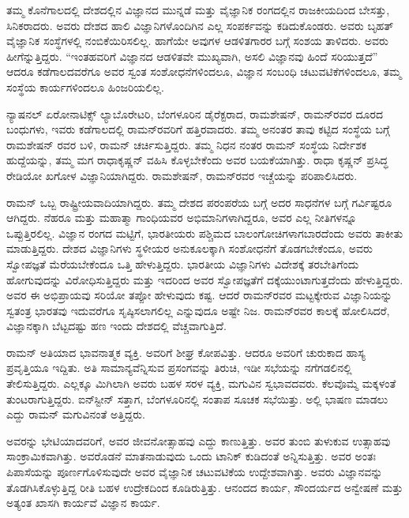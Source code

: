 ತಮ್ಮ ಕೊನೆಗಾಲದಲ್ಲಿ ದೇಶದಲ್ಲಿನ ವಿಜ್ಞಾನದ ಮುನ್ನಡೆ ಮತ್ತು ವೈಜ್ಞಾನಿಕ ರಂಗದಲ್ಲಿನ ರಾಜಕೀಯದಿಂದ ಬೇಸತ್ತು, ಸಿನಿಕರಾದರು. ಅವರು ದೇಶದ ಹಾಲಿ ವಿಜ್ಞಾನಿಗಳೊಂದಿಗಿನ ಎಲ್ಲ ಸಂಪರ್ಕವನ್ನು ಕಡಿದುಕೊಂಡರು. ಅವರು ಬೃಹತ್ ವೈಜ್ಞಾನಿಕ ಸಂಸ್ಥೆಗಳಲ್ಲಿ ನಂಬಿಕೆಯಿರಿಸಲಿಲ್ಲ. ಹಾಗೆಯೇ ಅವುಗಳ ಆಡಳಿತಗಾರರ ಬಗ್ಗೆ ಸಂಶಯ ತಾಳಿದರು. ಅವರು ಹೀಗೆನ್ನುತ್ತಿದ್ದರು. \enginline{--}“ಇಂತಹವರಿಗೆ ವಿಜ್ಞಾನದ ಆಡಳಿತವೇ ಮುಖ್ಯವಾಗಿ, ಅಸಲಿ ವಿಜ್ಞಾನವು ಹಿಂದೆ ಸರಿಯುತ್ತದೆ” ಆದರೂ ಕಡೆಗಾಲದವರೆಗೂ ಅವರ ಸ್ವಂತ ಸಂಶೋಧನೆಗಳಿಂದಲೂ, ವಿಜ್ಞಾನ ಸಂಬಂಧಿ ಚಟುವಟಿಕೆಗಳಿಂದಲೂ, ತಮ್ಮ ಸಂಸ್ಥೆಯ ಕಾರ್ಯಗಳಿಂದಲೂ ಹಿಂಜರಿಯಲಿಲ್ಲ.

ನ್ಯಾಷನಲ್ ಏರೋನಾಟಿಕ್ಸ್ ಲ್ಯಾಬೊರೇಟರಿ, ಬೆಂಗಳೂರಿನ ಡೈರೆಕ್ಟರಾದ, ರಾಮಶೇಷನ್, ರಾಮನ್‍ರವರ ದೂರದ ಬಂಧುಗಳು, ಇವರು ಕಡೆಗಾಲದಲ್ಲಿ ರಾಮನ್‍ರವರಿಗೆ ಹತ್ತಿರವಾದರು. ತಮ್ಮ ಅನಂತರ ತಾವು ಕಟ್ಟಿದ ಸಂಸ್ಥೆಯ ಬಗ್ಗೆ ರಾಮಶೇಷನ್ ರವರ ಬಳಿ, ರಾಮನ್ ಚರ್ಚಿಸುತ್ತಿದ್ದರು. ತಮ್ಮ ನಿಧನ ನಂತರ ರಾಮನ್ ಸಂಸ್ಥೆಯ ನಿರ್ದೇಶಕ ಹುದ್ದೆಯನ್ನು, ತಮ್ಮ ಮಗ ರಾಧಾಕೃಷ್ಣನ್ ವಹಿಸಿ ಕೊಳ್ಳಬೇಕೆಂದು ಅವರ ಬಯಕೆಯಾಗಿತ್ತು. ರಾಧಾ ಕೃಷ್ಣನ್ ಪ್ರಸಿದ್ಧ ರೇಡಿಯೋ ಖಗೋಳ ವಿಜ್ಞಾನಿಯಾಗಿದ್ದರು. ರಾಮಶೇಷನ್, ರಾಮನ್‍ರವರ ಇಚ್ಚೆಯನ್ನು ಪರಿಪಾಲಿಸಿದರು.

\vskip 2pt

ರಾಮನ್ ಒಬ್ಬ ರಾಷ್ಟ್ರೀಯವಾದಿಯಾಗಿದ್ದರು. ತಮ್ಮ ದೇಶದ ಪರಂಪರೆಯ ಬಗ್ಗೆ ಅದರ ಸಾಧನೆಗಳ ಬಗ್ಗೆ ಗರ್ವಿಷ್ಟರೂ ಆಗಿದ್ದರು. ನೆಹರೂ ಮತ್ತು ಮಹಾತ್ಮಾ ಗಾಂಧಿಯವರ ಅಭಿಮಾನಿ\-ಗಳಾಗಿದ್ದರೂ, ಅವರ ಎಲ್ಲ ನೀತಿಗಳನ್ನೂ ಒಪ್ಪುತ್ತಿರಲಿಲ್ಲ. ವಿಜ್ಞಾನ ರಂಗದ ಮಟ್ಟಿಗೆ, ಭಾರತೀಯರು ಪಶ್ಚಿಮದ ಬಾಲಂಗೋಚಿಗಳಾಗಬಾರದೆಂದು ಅವರು ತಾಕೀತು ಮಾಡುತ್ತಿದ್ದರು. ದೇಶದ ವಿಜ್ಞಾನಿಗಳು ಸ್ಥಳೀಯರ ಅನುಕೂಲಕ್ಕಾಗಿ ಸಂಶೋಧನೆಗೆ ತೊಡಗಬೇಕೆಂದೂ, ಅವರು ಸ್ವೋಪಜ್ಞತೆ ಮೆರೆಯ\-ಬೇಕೆಂದೂ ಒತ್ತಿ ಹೇಳುತ್ತಿದ್ದರು. ಭಾರತೀಯ ವಿಜ್ಞಾನಿಗಳು ವಿದೇಶಕ್ಕೆ ತರಬೇತಿಗೆಂದು ಹೋಗುವುದನ್ನು ವಿರೋಧಿಸುತ್ತಿದ್ದರು ಮತ್ತು ಇದರಿಂದ ಅವರ ಸ್ವೋಪಜ್ಞತೆಗೆ ದಕ್ಕೆಯುಂಟಾಗುತ್ತದೆಂದು ಹೇಳುತ್ತಿದ್ದರು. ಅವರ ಈ ಅಭಿಪ್ರಾಯವು ಸರಿಯೋ ತಪ್ಪೋ ಹೇಳುವುದು ಕಷ್ಟ. ಆದರೆ ರಾಮನ್‍ರವರ ಮಟ್ಟಕ್ಕೇರುವ ವಿಜ್ಞಾನಿಯನ್ನು ಸ್ವತಂತ್ರ ಭಾರತವು ಇದುವರೆಗೂ ಸೃಷ್ಠಿಸಲಾಗಲಿಲ್ಲ ಎನ್ನುವುದೂ ಅಷ್ಟೇ ನಿಜ. ರಾಮನ್‍ರವರ ಕಾಲಕ್ಕೆ ಹೋಲಿಸಿದರೆ, ವಿಜ್ಞಾನಕ್ಕಾಗಿ ಬೆಟ್ಟದಷ್ಟು ಹಣ ಇಂದು ದೇಶದಲ್ಲಿ ವೆಚ್ಚವಾಗುತ್ತಿದೆ.

\vskip 2pt

ರಾಮನ್ ಅತಿಯಾದ ಭಾವನಾತ್ಮಕ ವ್ಯಕ್ತಿ. ಅವರಿಗೆ ಶೀಘ್ರ ಕೋಪವಿತ್ತು. ಆದರೂ ಅವರಿಗೆ ಚುರುಕಾದ ಹಾಸ್ಯ ಪ್ರವೃತ್ತಿಯೂ ಇದ್ದಿತು. ಅತಿ ಸಾಮಾನ್ಯವೆನ್ನಿಸುವ ಪ್ರಸಂಗವನ್ನು ತಿರುಚಿ, ಇಡೀ ಸಭೆಯನ್ನು ನಗೆಗಡಲಿನಲ್ಲಿ ತೇಲಿಸುತ್ತಿದ್ದರು. ಎಲ್ಲಕ್ಕೂ ಮಿಗಿಲಾಗಿ ಅವರು ಬಹಳ ಸರಳ ವ್ಯಕ್ತಿ, ಮಗುವಿನ ಸ್ವಭಾವದವರು. ಕೆಲವೊಮ್ಮೆ ಮಕ್ಕಳಂತೆ ತುಂಟರಾಗುತ್ತಿದ್ದರು. ಐನ್‍ಸ್ಟೀನ್ ಸತ್ತಾಗ, ಬೆಂಗಳೂರಿನಲ್ಲಿ ಸಂತಾಪ ಸೂಚಕ ಸಭೆಯಿತ್ತು. ಅಲ್ಲಿ ಭಾಷಣ ಮಾಡಲು ಎದ್ದು ರಾಮನ್ ಮಗುವಿ\-ನಂತೆ ಅತ್ತಿದ್ದರು.

\vskip 2pt

ಅವರನ್ನು ಭೇಟಿಯಾದವರಿಗೆ, ಅವರ ಜೀವನೋತ್ಸಾಹವು ಎದ್ದು ಕಾಣುತ್ತಿತ್ತು. ಅವರ ತುಂಬಿ ತುಳುಕುವ ಉತ್ಸಾಹವು ಸಾಂಕ್ರಾಮಿಕವಾಗಿತ್ತು. ಅವರೊಡನೆ ಮಾತನಾಡುವುದು ಒಂದು ಟಾನಿಕ್ ಕುಡಿದಂತೆ ಅನ್ನಿಸುತ್ತಿತ್ತು. ಅವರ ಅಂತಃ ಪಿಪಾಸೆಯನ್ನು ಪೂರ್ಣಗೊಳಿಸುವುದೇ ಅವರ ವೈಜ್ಞಾನಿಕ ಚಟುವಟಿಕೆಯ ಉದ್ದೇಶವಾಗಿತ್ತು. ಅವರು ವಿಜ್ಞಾನವನ್ನು ತೊಡಗಿಸಿಕೊಳ್ಳುತ್ತಿದ್ದ ರೀತಿ ಬಹಳ ಉದ್ರೇಕದಿಂದ ಕೂಡಿರುತ್ತಿತ್ತು. ಆನಂದದ ಕಾರ್ಯ, ಸೌಂದರ್ಯದ ಅನ್ವೇಷಣೆ ಮತ್ತು ಅತ್ಯಂತ ಖಾಸಗಿ ಕಾರ್ಯವೆ ವಿಜ್ಞಾನ ಕಾರ್ಯ.

